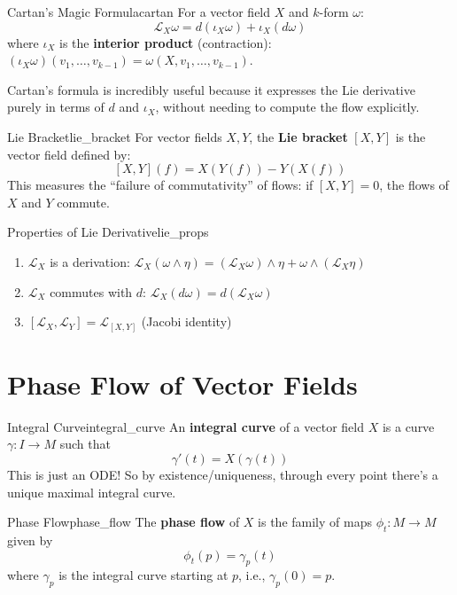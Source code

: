 \documentclass[11pt, letterpaper, openany]{book}
\begin{document}
\begin{thm}{Cartan's Magic Formula}{cartan}
For a vector field $X$ and $k$-form $\omega$:
\[\mathcal{L}_X \omega = d(\iota_X \omega) + \iota_X (d\omega)\]
where $\iota_X$ is the \textbf{interior product} (contraction): $(\iota_X \omega)(v_1, \ldots, v_{k-1}) = \omega(X, v_1, \ldots, v_{k-1})$.
\end{thm}

\begin{remark}
Cartan's formula is incredibly useful because it expresses the Lie derivative purely in terms of $d$ and $\iota_X$, without needing to compute the flow explicitly.
\end{remark}

\begin{defn}{Lie Bracket}{lie_bracket}
For vector fields $X, Y$, the \textbf{Lie bracket} $[X, Y]$ is the vector field defined by:
\[[X, Y](f) = X(Y(f)) - Y(X(f))\]
This measures the ``failure of commutativity'' of flows: if $[X, Y] = 0$, the flows of $X$ and $Y$ commute.
\end{defn}

\begin{thm}{Properties of Lie Derivative}{lie_props}
\begin{enumerate}
    \item $\mathcal{L}_X$ is a derivation: $\mathcal{L}_X(\omega \wedge \eta) = (\mathcal{L}_X \omega) \wedge \eta + \omega \wedge (\mathcal{L}_X \eta)$
    \item $\mathcal{L}_X$ commutes with $d$: $\mathcal{L}_X(d\omega) = d(\mathcal{L}_X \omega)$
    \item $[\mathcal{L}_X, \mathcal{L}_Y] = \mathcal{L}_{[X,Y]}$ (Jacobi identity)
\end{enumerate}
\end{thm}

\section{Phase Flow of Vector Fields}

\begin{defn}{Integral Curve}{integral_curve}
An \textbf{integral curve} of a vector field $X$ is a curve $\gamma: I \to M$ such that
\[\gamma'(t) = X(\gamma(t))\]
This is just an ODE! So by existence/uniqueness, through every point there's a unique maximal integral curve.
\end{defn}

\begin{defn}{Phase Flow}{phase_flow}
The \textbf{phase flow} of $X$ is the family of maps $\phi_t: M \to M$ given by
\[\phi_t(p) = \gamma_p(t)\]
where $\gamma_p$ is the integral curve starting at $p$, i.e., $\gamma_p(0) = p$.
\end{defn}
\end{document}
